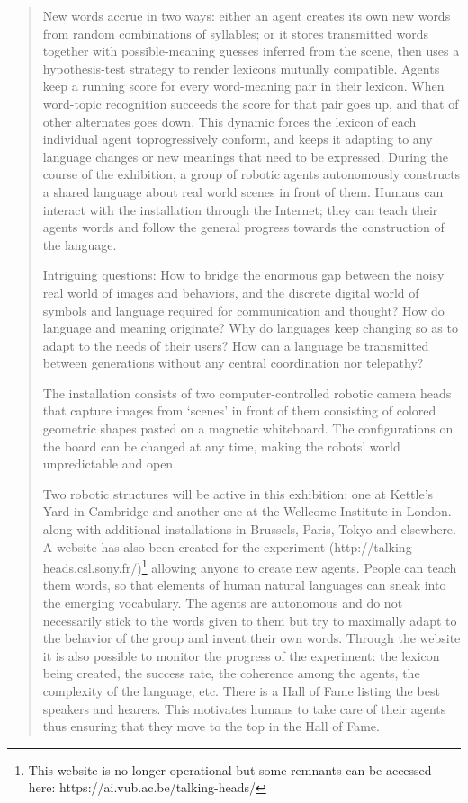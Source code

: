 \begin{quotation}
New words accrue in two ways: either an agent creates its own new words from random combinations of syllables; or it stores transmitted words together with possible-meaning guesses inferred from the scene, then uses a hypothesis-test strategy to render lexicons mutually compatible. Agents keep a running score for every word-meaning pair in their lexicon. When word-topic recognition succeeds the score for that pair goes up, and that of other alternates goes down. This dynamic forces the lexicon of each individual agent toprogressively conform, and keeps it adapting to any language changes or new meanings that need to be expressed. During the course of the exhibition, a group of robotic agents autonomously constructs a shared language about real world scenes in front of them. Humans can interact with the installation through the Internet; they can teach their agents words and follow the general progress towards the construction of the language.

Intriguing questions: How to bridge the enormous gap between the noisy real world of images and behaviors, and the discrete digital world of symbols and language required for communication and thought? How do language and meaning originate? Why do languages keep changing so as to adapt to the needs of their users? How can a language be transmitted between generations without any central coordination nor telepathy?

The installation consists of two computer-controlled robotic camera heads that capture images from `scenes' in front of them consisting of colored geometric shapes pasted on a magnetic whiteboard. The configurations on the board can be changed at any time, making the robots' world unpredictable and open.

Two robotic structures will be active in this exhibition: one at Kettle's Yard in Cambridge and another one at the Wellcome Institute in London. along with additional installations in Brussels, Paris, Tokyo and elsewhere. A website has also been created for the experiment (http://talking-heads.csl.sony.fr/)\footnote{This website is no longer operational but some remnants can be accessed here: 
https://ai.vub.ac.be/talking-heads/} 
allowing anyone to create new agents. People can teach them words, so that elements of human natural languages can sneak into the emerging vocabulary. The agents are autonomous and do not necessarily stick to the words given to them but try to maximally adapt to the behavior of the group and invent their own words. Through the website it is also possible to monitor the progress of the experiment: the lexicon being created, the success rate, the coherence among the agents, the complexity of the language, etc. There is a Hall of Fame listing the best speakers and hearers. This motivates humans to take care of their agents thus ensuring that they move to the top in the Hall of Fame.


\end{quotation}
